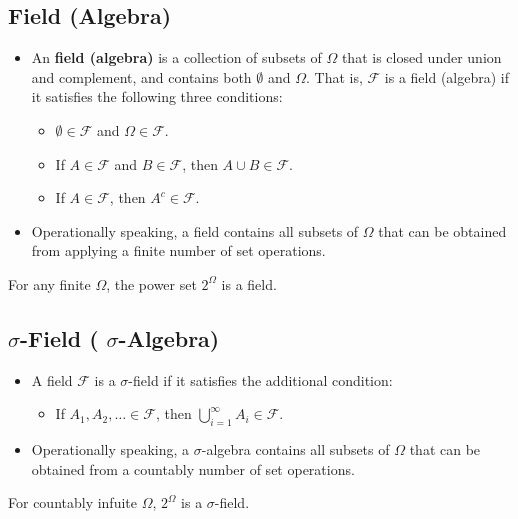 \subsection{Field (Algebra)}
\begin{itemize}
\item An \textbf{field (algebra)} is a collection of subsets of
  \(\Omega\) that is closed under union and complement, and contains
  both \(\emptyset\) and \(\Omega\). That is, \(\mathcal{F}\) is a
  field (algebra) if it satisfies the following three conditions:
\begin{itemize}
\item \(\emptyset \in \mathcal{F}\) and \(\Omega \in \mathcal{F}\).
\item If \(A \in \mathcal{F}\) and \(B \in \mathcal{F}\), then \(A \cup B \in \mathcal{F}\). 
\item If \(A \in \mathcal{F}\), then \(A^{c} \in \mathcal{F}\).
\end{itemize}
  
\item Operationally speaking, a field contains all subsets of
  \(\Omega\) that can be obtained from applying a finite number of set
  operations.
\end{itemize}

\begin{fact}
 For any finite \(\Omega\), the power set \(2^{\Omega}\) is a field.
\end{fact}

\subsection{\(\sigma\)-Field ( \(\sigma\)-Algebra)}
\begin{itemize}
\item A field \(\mathcal{F}\) is a \(\sigma\)-field if it satisfies the
additional condition:
\begin{itemize}
\item If \(A_{1}, A_{2}, \ldots \in \mathcal{F}\), then \(\bigcup_{i=1}^{\infty} A_{i} \in \mathcal{F}\).
\end{itemize}

\item Operationally speaking, a \(\sigma\)-algebra contains all
  subsets of \(\Omega\) that can be obtained from a countably number
  of set operations.
\end{itemize}
\begin{fact}
For countably infuite \(\Omega\), \(2^{\Omega}\) is a \(\sigma\)-field.
\end{fact} 

